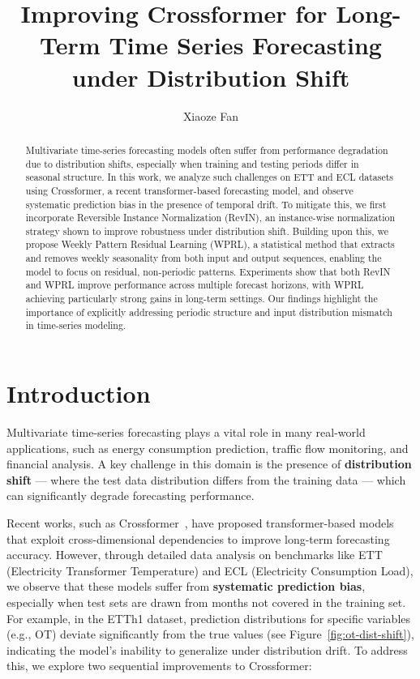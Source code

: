 \documentclass{article}
\title{Improving Crossformer for Long-Term Time Series Forecasting under Distribution Shift}
\author{
  Xiaoze Fan
}
\begin{document}
\maketitle


\begin{abstract}
Multivariate time-series forecasting models often suffer from performance degradation due to distribution shifts, especially when training and testing periods differ in seasonal structure. In this work, we analyze such challenges on ETT and ECL datasets using Crossformer, a recent transformer-based forecasting model, and observe systematic prediction bias in the presence of temporal drift. To mitigate this, we first incorporate Reversible Instance Normalization (RevIN), an instance-wise normalization strategy shown to improve robustness under distribution shift. Building upon this, we propose Weekly Pattern Residual Learning (WPRL), a statistical method that extracts and removes weekly seasonality from both input and output sequences, enabling the model to focus on residual, non-periodic patterns. Experiments show that both RevIN and WPRL improve performance across multiple forecast horizons, with WPRL achieving particularly strong gains in long-term settings. Our findings highlight the importance of explicitly addressing periodic structure and input distribution mismatch in time-series modeling.
\end{abstract}



\section{Introduction}

Multivariate time-series forecasting plays a vital role in many real-world applications, such as energy consumption prediction, traffic flow monitoring, and financial analysis. A key challenge in this domain is the presence of \textbf{distribution shift} — where the test data distribution differs from the training data — which can significantly degrade forecasting performance.

Recent works, such as Crossformer~\cite{crossformer2023}, have proposed transformer-based models that exploit cross-dimensional dependencies to improve long-term forecasting accuracy. However, through detailed data analysis on benchmarks like ETT (Electricity Transformer Temperature) and ECL (Electricity Consumption Load), we observe that these models suffer from \textbf{systematic prediction bias}, especially when test sets are drawn from months not covered in the training set. For example, in the ETTh1 dataset, prediction distributions for specific variables (e.g., OT) deviate significantly from the true values (see Figure~\ref{fig:ot-dist-shift}), indicating the model's inability to generalize under distribution drift.
To address this, we explore two sequential improvements to Crossformer:
\end{document}
